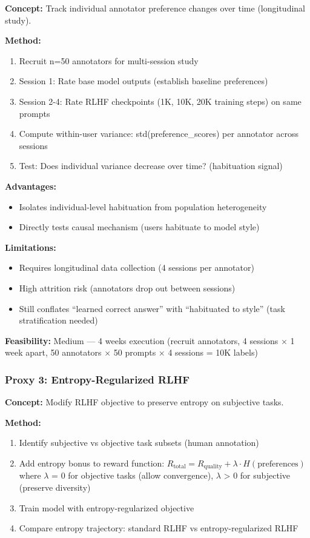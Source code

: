\textbf{Concept:} Track individual annotator preference changes over time (longitudinal study).

\textbf{Method:}
\begin{enumerate}
\item Recruit n=50 annotators for multi-session study
\item Session 1: Rate base model outputs (establish baseline preferences)
\item Session 2-4: Rate RLHF checkpoints (1K, 10K, 20K training steps) on same prompts
\item Compute within-user variance: std(preference\_scores) per annotator across sessions
\item Test: Does individual variance decrease over time? (habituation signal)
\end{enumerate}

\textbf{Advantages:}
\begin{itemize}
\item Isolates individual-level habituation from population heterogeneity
\item Directly tests causal mechanism (users habituate to model style)
\end{itemize}

\textbf{Limitations:}
\begin{itemize}
\item Requires longitudinal data collection (4 sessions per annotator)
\item High attrition risk (annotators drop out between sessions)
\item Still conflates ``learned correct answer'' with ``habituated to style'' (task stratification needed)
\end{itemize}

\textbf{Feasibility:} Medium — 4 weeks execution (recruit annotators, 4 sessions $\times$ 1 week apart, 50 annotators $\times$ 50 prompts $\times$ 4 sessions = 10K labels)

\subsubsection{Proxy 3: Entropy-Regularized RLHF}

\textbf{Concept:} Modify RLHF objective to preserve entropy on subjective tasks.

\textbf{Method:}
\begin{enumerate}
\item Identify subjective vs objective task subsets (human annotation)
\item Add entropy bonus to reward function: $R_{\text{total}} = R_{\text{quality}} + \lambda \cdot H(\text{preferences})$ where $\lambda$ = 0 for objective tasks (allow convergence), $\lambda$ > 0 for subjective (preserve diversity)
\item Train model with entropy-regularized objective
\item Compare entropy trajectory: standard RLHF vs entropy-regularized RLHF
\end{enumerate}

